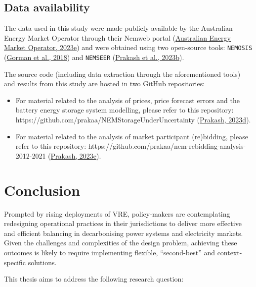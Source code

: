 \documentclass[12pt,a4paper,]{report}
\providecommand{\tightlist}{%
  \setlength{\itemsep}{0pt}\setlength{\parskip}{0pt}}
\begin{document}
\hypertarget{data-availability}{%
\section*{Data availability}\label{data-availability}}

The data used in this study were made publicly available by the
Australian Energy Market Operator through their Nemweb portal
(\protect\hyperlink{ref-australianenergymarketoperatorNemwebMarketData2023}{Australian
Energy Market Operator, 2023e}) and were obtained using two open-source
tools: \texttt{NEMOSIS}
(\protect\hyperlink{ref-gormanNEMOSISNEMOpen2018}{Gorman et al., 2018})
and \texttt{NEMSEER}
(\protect\hyperlink{ref-prakashNEMSEERPythonPackage2023}{Prakash et al.,
2023b}).

The source code (including data extraction through the aforementioned
tools) and results from this study are hosted in two GitHub
repositories:

\begin{itemize}
\tightlist
\item
  For material related to the analysis of prices, price forecast errors
  and the battery energy storage system modelling, please refer to this
  repository: https://github.com/prakaa/NEMStorageUnderUncertainty
  (\protect\hyperlink{ref-prakashNEMStorageUnderUncertainty2023}{Prakash,
  2023d}).
\item
  For material related to the analysis of market participant
  (re)bidding, please refer to this repository:
  https://github.com/prakaa/nem-rebidding-analysis-2012-2021
  (\protect\hyperlink{ref-prakashNEMReBidding2023}{Prakash, 2023e}).
\end{itemize}

\hypertarget{sec:conclusion}{%
\chapter{Conclusion}\label{sec:conclusion}}

Prompted by rising deployments of VRE, policy-makers are contemplating
redesigning operational practices in their jurisdictions to deliver more
effective and efficient balancing in decarbonising power systems and
electricity markets. Given the challenges and complexities of the design
problem, achieving these outcomes is likely to require implementing
flexible, ``second-best'' and context-specific solutions.

This thesis aims to address the following research question:
\end{document}
